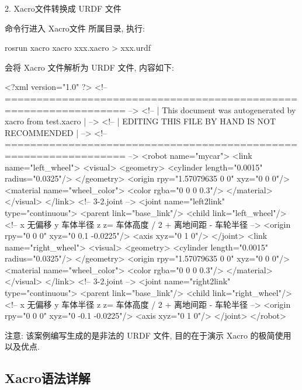 \documentclass[openany, fontset=windowsold]{ctexbook}
\theoremstyle{kaiti}
\theoremstyle{normal}
\begin{document}
2. Xacro文件转换成 URDF 文件

命令行进入 Xacro文件 所属目录, 执行:

\begin{bash}
  rosrun xacro xacro xxx.xacro > xxx.urdf
\end{bash}

会将 Xacro 文件解析为 URDF 文件, 内容如下:

\begin{xml}
  <?xml version="1.0" ?>
  <!-- ================================================================= -->
  <!-- |    This document was autogenerated by xacro from test.xacro   | -->
  <!-- |    EDITING THIS FILE BY HAND IS NOT RECOMMENDED          | -->
  <!-- ================================================================= -->
  <robot name="mycar">
    <link name="left_wheel">
      <visual>
        <geometry>
          <cylinder length="0.0015" radius="0.0325"/>
        </geometry>
        <origin rpy="1.57079635 0 0" xyz="0 0 0"/>
        <material name="wheel_color">
          <color rgba="0 0 0 0.3"/>
        </material>
      </visual>
    </link>
    <!-- 3-2.joint -->
    <joint name="left2link" type="continuous">
      <parent link="base_link"/>
      <child link="left_wheel"/>
      <!-- 
                  x 无偏移
                  y 车体半径
                  z z= 车体高度 / 2 + 离地间距 - 车轮半径
              -->
      <origin rpy="0 0 0" xyz="0 0.1 -0.0225"/>
      <axis xyz="0 1 0"/>
    </joint>
    <link name="right_wheel">
      <visual>
        <geometry>
          <cylinder length="0.0015" radius="0.0325"/>
        </geometry>
        <origin rpy="1.57079635 0 0" xyz="0 0 0"/>
        <material name="wheel_color">
          <color rgba="0 0 0 0.3"/>
        </material>
      </visual>
    </link>
    <!-- 3-2.joint -->
    <joint name="right2link" type="continuous">
      <parent link="base_link"/>
      <child link="right_wheel"/>
      <!-- 
                  x 无偏移
                  y 车体半径
                  z z= 车体高度 / 2 + 离地间距 - 车轮半径
              -->
      <origin rpy="0 0 0" xyz="0 -0.1 -0.0225"/>
      <axis xyz="0 1 0"/>
    </joint>
  </robot>
\end{xml}

注意: 该案例编写生成的是非法的 URDF 文件, 目的在于演示 Xacro 的极简使用以及优点.

\subsection{Xacro语法详解}
\end{document}
